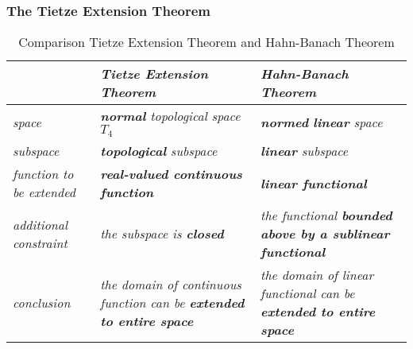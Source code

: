 \documentclass[11pt]{article}
\begin{document}
\subsubsection{The Tietze Extension Theorem}
\begin{table}[tb]
\setlength{\abovedisplayskip}{0pt}
\setlength{\belowdisplayskip}{-10pt}
\setlength{\abovedisplayshortskip}{0pt}
\setlength{\belowdisplayshortskip}{0pt}
\footnotesize
\centering
\caption{Comparison Tietze Extension Theorem and Hahn-Banach Theorem}
\label{tab: extension}
\renewcommand\tabularxcolumn[1]{m{#1}}
\small
\begin{tabularx}{1\textwidth} { 
  | >{\raggedright\arraybackslash} m{3cm}
  | >{\centering\arraybackslash}X
  | >{\centering\arraybackslash}X  | }
 \hline
  &  \emph{Tietze Extension Theorem} & \emph{Hahn-Banach Theorem}   \\
  \hline \vspace{5pt}
\emph{space}    \vspace{2pt} & \emph{\textbf{normal} topological space $T_4$ }  & \emph{\textbf{normed} \textbf{linear} space} \\
 \hline \vspace{5pt}
\emph{subspace}  \vspace{2pt} &  \emph{\textbf{topological} subspace}  & \emph{\textbf{linear} subspace}  \\
 \hline \vspace{5pt}
\emph{function to be extended} \vspace{2pt}  &  \emph{\textbf{real-valued continuous function }}  & \emph{\textbf{linear functional}}  \\
\hline \vspace{5pt}
\emph{additional constraint}  \vspace{2pt}  & \emph{the subspace is \textbf{closed}}    & \emph{the functional \textbf{bounded above by a sublinear functional}}  \\
\hline \vspace{5pt}
\emph{conclusion}  \vspace{2pt}  & \emph{the domain of continuous function can be \textbf{extended to entire space}}    & \emph{the domain of linear functional can be \textbf{extended to entire space}}  \\
\hline
\end{tabularx}
\end{table}
\end{document}
